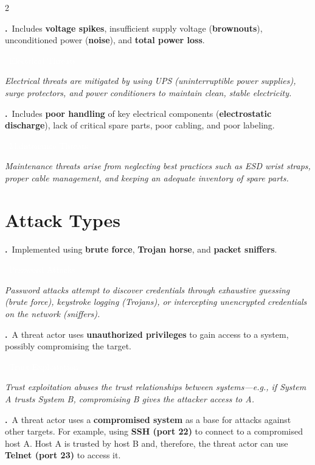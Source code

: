 \documentclass[9pt]{article}
\newcommand{\answer}[1]{%
  \par\nobreak\vspace{1pt}%
  \colorbox{AnswerRed}{\textcolor{white}{\bfseries\small\strut\ #1\ }}%
  \par\vspace{0pt}%
}
\newcommand{\hl}[1]{\textbf{\textcolor{themeColor}{#1}}}
\newcommand{\explain}[1]{%
  \par\nobreak\vspace{0pt}%
  \begin{tcolorbox}[
    colback=LightRedBg,
    colframe=themeColor!25,
    boxrule=0.3pt,
    arc=2pt,
    left=5pt, right=5pt,
    top=2pt, bottom=2pt,
    before skip=1pt,
    after skip=2pt
  ]
  {\small\textit{#1}}
  \end{tcolorbox}
}
\newcounter{qnum}
\newcommand{\question}[1]{%
  \stepcounter{qnum}%
  \par\vspace{10pt}%
  {\bfseries\color{themeColor}\theqnum.}\ #1%
}
\begin{document}
\begin{multicols}{2}
\question{Includes \hl{voltage spikes}, insufficient supply voltage (\hl{brownouts}), unconditioned power (\hl{noise}), and \hl{total power loss}.}

\answer{Electrical Threats}

\explain{Electrical threats are mitigated by using UPS (uninterruptible power supplies), surge protectors, and power conditioners to maintain clean, stable electricity.}


\question{Includes \hl{poor handling} of key electrical components (\hl{electrostatic discharge}), lack of critical spare parts, poor cabling, and poor labeling.}

\answer{Maintenance Threats}

\explain{Maintenance threats arise from neglecting best practices such as ESD wrist straps, proper cable management, and keeping an adequate inventory of spare parts.}

\section{Attack Types}

\question{Implemented using \hl{brute force}, \hl{Trojan horse}, and \hl{packet sniffers}.}

\answer{Password Attacks}

\explain{Password attacks attempt to discover credentials through exhaustive guessing (brute force), keystroke logging (Trojans), or intercepting unencrypted credentials on the network (sniffers).}


\question{A threat actor uses \hl{unauthorized privileges} to gain access to a system, possibly compromising the target.}

\answer{Trust Exploitation}

\explain{Trust exploitation abuses the trust relationships between systems—e.g., if System A trusts System B, compromising B gives the attacker access to A.}


\question{A threat actor uses a \hl{compromised system} as a base for attacks against other targets. For example, using \hl{SSH (port 22)} to connect to a compromised host A. Host A is trusted by host B and, therefore, the threat actor can use \hl{Telnet (port 23)} to access it.}


\end{multicols}
\end{document}

